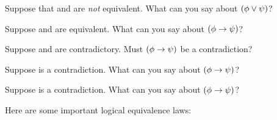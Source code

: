 \begin{earg}
\item Suppose that \meta{\phi} and \meta{\psi} are \emph{not} equivalent. What can you say about  $(\mathcal{\phi}\vee\mathcal{\psi})$?
\item Suppose \meta{\phi} and \meta{\psi} are equivalent. What can you say about $(\mathcal{\phi} \rightarrow \mathcal{\psi})$?
\item Suppose \meta{\phi} and \meta{\psi} are contradictory.  Must $(\mathcal{\phi} \rightarrow \mathcal{\psi})$ be a contradiction?
\item Suppose \meta{\phi} is a contradiction.  What can you say about $(\mathcal{\phi} \rightarrow \mathcal{\psi})$?
\item Suppose \meta{\psi} is a contradiction.  What can you say about $(\mathcal{\phi} \rightarrow \mathcal{\psi})$?

\end{earg}



\problempart Here are some important logical equivalence laws:



